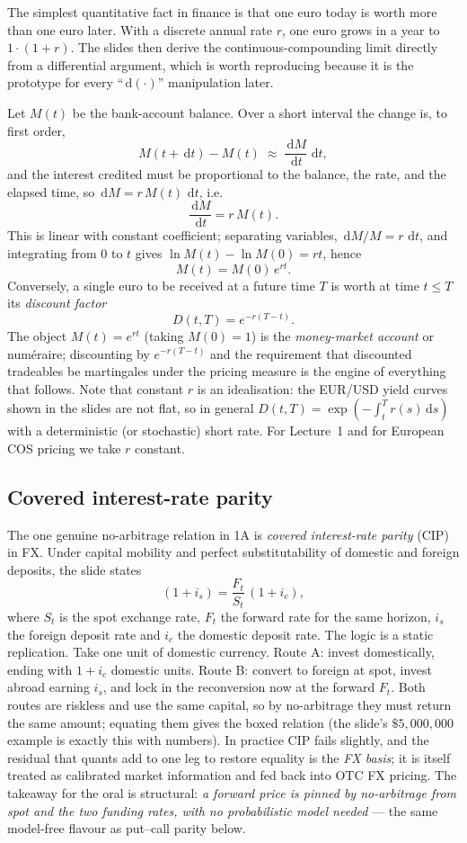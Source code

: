 \documentclass[11pt]{article}
\newcommand{\dd}{\,\mathrm{d}}
\begin{document}
The simplest quantitative fact in finance is that one euro today is worth more than one euro later. With a discrete annual rate $r$, one euro grows in a year to $1\cdot(1+r)$. The slides then derive the continuous-compounding limit directly from a differential argument, which is worth reproducing because it is the prototype for every ``$\dd(\cdot)$'' manipulation later.

Let $M(t)$ be the bank-account balance. Over a short interval the change is, to first order,
\[
M(t+\dd t)-M(t)\;\approx\;\frac{\dd M}{\dd t}\,\dd t,
\]
and the interest credited must be proportional to the balance, the rate, and the elapsed time, so $\dd M = r\,M(t)\,\dd t$, i.e.
\[
\frac{\dd M}{\dd t}=r\,M(t).
\]
This is linear with constant coefficient; separating variables, $\dd M/M = r\,\dd t$, and integrating from $0$ to $t$ gives $\ln M(t)-\ln M(0)=rt$, hence
\[
\boxed{\,M(t)=M(0)\,e^{rt}.\,}
\]
Conversely, a single euro to be received at a future time $T$ is worth at time $t\le T$ its \emph{discount factor}
\[
D(t,T)=e^{-r(T-t)}.
\]
The object $M(t)=e^{rt}$ (taking $M(0)=1$) is the \emph{money-market account} or num\'eraire; discounting by $e^{-r(T-t)}$ and the requirement that discounted tradeables be martingales under the pricing measure is the engine of everything that follows. Note that constant $r$ is an idealisation: the EUR/USD yield curves shown in the slides are not flat, so in general $D(t,T)=\exp(-\int_t^T r(s)\dd s)$ with a deterministic (or stochastic) short rate. For Lecture~1 and for European COS pricing we take $r$ constant.

\subsection{Covered interest-rate parity}

The one genuine no-arbitrage relation in 1A is \emph{covered interest-rate parity} (CIP) in FX. Under capital mobility and perfect substitutability of domestic and foreign deposits, the slide states
\[
(1+i_s)=\frac{F_t}{S_t}\,(1+i_c),
\]
where $S_t$ is the spot exchange rate, $F_t$ the forward rate for the same horizon, $i_s$ the foreign deposit rate and $i_c$ the domestic deposit rate. The logic is a static replication. Take one unit of domestic currency. Route A: invest domestically, ending with $1+i_c$ domestic units. Route B: convert to foreign at spot, invest abroad earning $i_s$, and lock in the reconversion now at the forward $F_t$. Both routes are riskless and use the same capital, so by no-arbitrage they must return the same amount; equating them gives the boxed relation (the slide's $\$5{,}000{,}000$ example is exactly this with numbers). In practice CIP fails slightly, and the residual that quants add to one leg to restore equality is the \emph{FX basis}; it is itself treated as calibrated market information and fed back into OTC FX pricing. The takeaway for the oral is structural: \emph{a forward price is pinned by no-arbitrage from spot and the two funding rates, with no probabilistic model needed} --- the same model-free flavour as put--call parity below.
\end{document}
